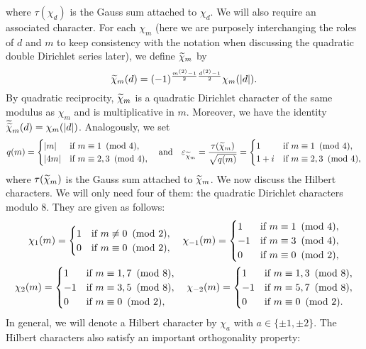 \documentclass[12pt,reqno,oneside]{amsart}
\begin{document}
    where $\tau(\chi_{d})$ is the Gauss sum attached to $\chi_{d}$. We will also require an associated character. For each $\chi_{m}$ (here we are purposely interchanging the roles of $d$ and $m$ to keep consistency with the notation when discussing the quadratic double Dirichlet series later), we define $\widetilde{\chi}_{m}$ by
    \[
        \widetilde{\chi}_{m}(d) = (-1)^{\frac{m^{(2)}-1}{2}\frac{d^{(2)}-1}{2}}\chi_{m}(|d|).
    \]
    By quadratic reciprocity, $\widetilde{\chi}_{m}$ is a quadratic Dirichlet character of the same modulus as $\chi_{m}$ and is multiplicative in $m$. Moreover, we have the identity $\widetilde{\widetilde{\chi}}_{m}(d) = \chi_{m}(|d|)$. Analogously, we set
    \[
        q(m) = \begin{cases} |m| & \text{if $m \equiv 1 \ \left(\text{mod }4\right)$}, \\ |4m| & \text{if $m \equiv 2,3 \ \left(\text{mod }4\right)$}, \end{cases} \quad \text{and} \quad \varepsilon_{\widetilde{\chi}_{m}} = \frac{\tau(\widetilde{\chi}_{m})}{\sqrt{q(m)}} = \begin{cases} 1 & \text{if $m \equiv 1 \ \left(\text{mod }4\right)$}, \\ 1+i & \text{if $m \equiv 2,3 \ \left(\text{mod }4\right)$}, \end{cases}
    \]
    where $\tau(\widetilde{\chi}_{m})$ is the Gauss sum attached to $\widetilde{\chi}_{m}$. We now discuss the Hilbert characters. We will only need four of them: the quadratic Dirichlet characters modulo $8$. They are given as follows:
    \begin{gather*}
        \chi_{1}(m) = \begin{cases} 1 &\text{if $m \not\equiv 0 \ \left(\text{mod }2\right)$}, \\ 0 &\text{if $m \equiv 0 \ \left(\text{mod }2\right)$}, \end{cases} \quad \chi_{-1}(m) = \begin{cases} 1 &\text{if $m \equiv 1 \ \left(\text{mod }4\right)$}, \\ -1 &\text{if $m \equiv 3 \ \left(\text{mod }4\right)$}, \\ 0 &\text{if $m \equiv 0 \ \left(\text{mod }2\right)$}, \end{cases} \\ \chi_{2}(m) = \begin{cases} 1 &\text{if $m \equiv 1,7 \ \left(\text{mod }8\right)$}, \\ -1 &\text{if $m \equiv 3,5 \ \left(\text{mod }8\right)$}, \\ 0 &\text{if $m \equiv 0 \ \left(\text{mod }2\right)$}, \end{cases} \quad \chi_{-2}(m) = \begin{cases} 1 &\text{if $m \equiv 1,3 \ \left(\text{mod }8\right)$}, \\ -1 &\text{if $m \equiv 5,7 \ \left(\text{mod }8\right)$}, \\ 0 &\text{if $m \equiv 0 \ \left(\text{mod }2\right)$}. \end{cases}
    \end{gather*}
    In general, we will denote a Hilbert character by $\chi_{a}$ with $a \in \{\pm1,\pm2\}$. The Hilbert characters also satisfy an important orthogonality property:
\end{document}
